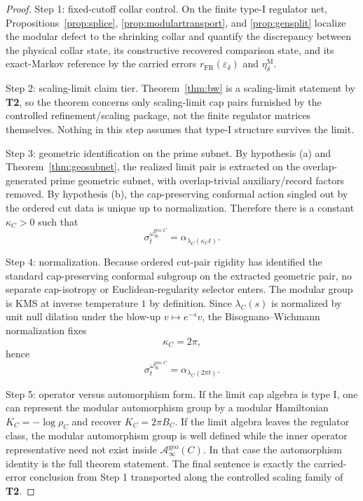 \documentclass[11pt]{article}
\begin{document}
\begin{proof}
Step 1: fixed-cutoff collar control. On the finite type-I regulator net, Propositions~\ref{prop:splice}, \ref{prop:modulartransport}, and \ref{prop:gensplit} localize the modular defect to the shrinking collar and quantify the discrepancy between the physical collar state, its constructive recovered comparison state, and its exact-Markov reference by the carried errors \(r_{\mathrm{FR}}(\varepsilon_\delta)\) and \(\eta_\delta^{\mathrm M}\).

Step 2: scaling-limit claim tier. Theorem~\ref{thm:bw} is a scaling-limit statement by \textbf{T2}, so the theorem concerns only scaling-limit cap pairs furnished by the controlled refinement/scaling package, not the finite regulator matrices themselves. Nothing in this step assumes that type-I structure survives the limit.

Step 3: geometric identification on the prime subnet. By hypothesis \textup{(a)} and Theorem~\ref{thm:geosubnet}, the realized limit pair is extracted on the overlap-generated prime geometric subnet, with overlap-trivial auxiliary/record factors removed. By hypothesis \textup{(b)}, the cap-preserving conformal action singled out by the ordered cut data is unique up to normalization. Therefore there is a constant \(\kappa_C>0\) such that
\[
\sigma_t^{\omega_\infty^{\mathrm{geo},C}}=\alpha_{\lambda_C(\kappa_C t)}.
\]

Step 4: normalization. Because ordered cut-pair rigidity has identified the standard cap-preserving conformal subgroup on the extracted geometric pair, no separate cap-isotropy or Euclidean-regularity selector enters. The modular group is KMS at inverse temperature \(1\) by definition. Since \(\lambda_C(s)\) is normalized by unit null dilation under the blow-up \(v\mapsto e^{-s}v\), the Bisognano--Wichmann normalization fixes
\[
\kappa_C=2\pi,
\]
hence
\[
\sigma_t^{\omega_\infty^{\mathrm{geo},C}}
=
\alpha_{\lambda_C(2\pi t)}.
\]

Step 5: operator versus automorphism form. If the limit cap algebra is type I, one can represent the modular automorphism group by a modular Hamiltonian \(K_C=-\log\rho_C\) and recover \(K_C=2\pi B_C\). If the limit algebra leaves the regulator class, the modular automorphism group is well defined while the inner operator representative need not exist inside \(\mathcal A_\infty^{\mathrm{geo}}(C)\). In that case the automorphism identity is the full theorem statement. The final sentence is exactly the carried-error conclusion from Step 1 transported along the controlled scaling family of \textbf{T2}.
\end{proof}
\end{document}
